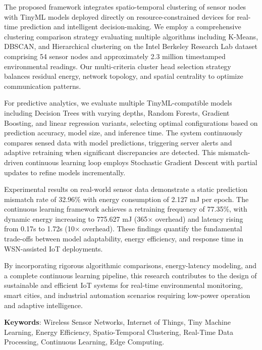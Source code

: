 \documentclass[12pt,a4paper]{article}
\begin{document}
The proposed framework integrates spatio-temporal clustering of sensor nodes with TinyML models deployed directly on resource-constrained devices for real-time prediction and intelligent decision-making. We employ a comprehensive clustering comparison strategy evaluating multiple algorithms including K-Means, DBSCAN, and Hierarchical clustering on the Intel Berkeley Research Lab dataset comprising 54 sensor nodes and approximately 2.3 million timestamped environmental readings. Our multi-criteria cluster head selection strategy balances residual energy, network topology, and spatial centrality to optimize communication patterns.

For predictive analytics, we evaluate multiple TinyML-compatible models including Decision Trees with varying depths, Random Forests, Gradient Boosting, and linear regression variants, selecting optimal configurations based on prediction accuracy, model size, and inference time. The system continuously compares sensed data with model predictions, triggering server alerts and adaptive retraining when significant discrepancies are detected. This mismatch-driven continuous learning loop employs Stochastic Gradient Descent with partial updates to refine models incrementally.

Experimental results on real-world sensor data demonstrate a static prediction mismatch rate of 32.96\% with energy consumption of 2.127 mJ per epoch. The continuous learning framework achieves a retraining frequency of 77.35\%, with dynamic energy increasing to 775.627 mJ (365$\times$ overhead) and latency rising from 0.17s to 1.72s (10$\times$ overhead). These findings quantify the fundamental trade-offs between model adaptability, energy efficiency, and response time in WSN-assisted IoT deployments.

By incorporating rigorous algorithmic comparisons, energy-latency modeling, and a complete continuous learning pipeline, this research contributes to the design of sustainable and efficient IoT systems for real-time environmental monitoring, smart cities, and industrial automation scenarios requiring low-power operation and adaptive intelligence.

\textbf{Keywords}: Wireless Sensor Networks, Internet of Things, Tiny Machine Learning, Energy Efficiency, Spatio-Temporal Clustering, Real-Time Data Processing, Continuous Learning, Edge Computing.

\clearpage
\tableofcontents


\newpage
\end{document}
